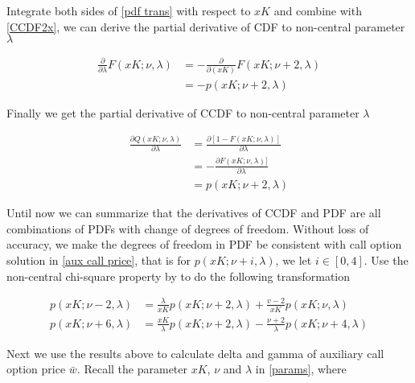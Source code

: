 \noindent Integrate both sides of \eqref{pdf trans} with respect to $xK$ and combine with \eqref{CCDF2x}, we can derive the partial derivative of CDF to non-central parameter $\lambda$

\begin{equation}\label{CCDF2lambda}
    \begin{aligned}
        \frac{\partial}{\partial \lambda} F(xK;\nu,\lambda)&=-\frac{\partial}{\partial (xK)}F(xK;\nu+2,\lambda) \\
        &= -p(xK;\nu+2,\lambda)
    \end{aligned}
\end{equation}

\noindent Finally we get the partial derivative of CCDF to non-central parameter $\lambda$

\begin{equation}\label{CCDF2lambda}
    \begin{aligned}
        \frac{\partial Q(xK; \nu, \lambda)}{\partial \lambda}&=\frac{\partial[1-F(xK; \nu, \lambda)]}{\partial \lambda} \\ 
        &=-\frac{\partial F(xK; \nu, \lambda)]}{\partial \lambda}\\
        &= p(xK;\nu+2,\lambda)
    \end{aligned}
\end{equation}

Until now we can summarize that the derivatives of CCDF and PDF are all combinations of PDFs with change of degrees of freedom. Without loss of accuracy, we make the degrees of freedom in PDF be consistent with call option solution in \eqref{aux call price}, that is for $p(xK;\nu+i, \lambda)$, we let $i \in [0,4]$. Use the non-central chi-square property by \cite{cohen_noncentral_1988} to do the following transformation

\begin{equation}\label{trans}
    \begin{aligned}
        p(xK ; \nu-2, \lambda)&=\frac{\lambda}{xK} p(xK ; \nu+2, \lambda)+\frac{v-2}{xK} p(xK ; \nu, \lambda) \\
        p(xK ; \nu+6, \lambda)&=\frac{xK}{\lambda} p(xK ; \nu+2, \lambda)-\frac{\nu+2}{\lambda} p(xK ; \nu+4, \lambda)
    \end{aligned}
\end{equation}

Next we use the results above to calculate delta and gamma of auxiliary call option price $\bar{w}$. Recall the parameter $xK$, $\nu$ and $\lambda$ in \eqref{params}, where

